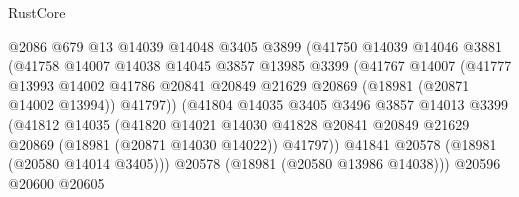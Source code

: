 \begin{lexlean}{RustCore}
\begin{coremodule}
                                @2086
                                @679
                                @13
                                @14039
                                @14048
                                @3405
                                @3899
                                (@41750
                                  @14039
                                  @14046
                                  @3881
                                  (@41758
                                    @14007
                                    @14038
                                    @14045
                                    @3857
                                    @13985
                                    @3399
                                    (@41767
                                      @14007
                                      (@41777
                                        @13993
                                        @14002
                                        @41786
                                        @20841
                                        @20849
                                        @21629
                                        @20869
                                        (@18981 (@20871 @14002 @13994))
                                        @41797))
                                    (@41804
                                      @14035
                                      @3405
                                      @3496
                                      @3857
                                      @14013
                                      @3399
                                      (@41812
                                        @14035
                                        (@41820
                                          @14021
                                          @14030
                                          @41828
                                          @20841
                                          @20849
                                          @21629
                                          @20869
                                          (@18981 (@20871 @14030 @14022))
                                          @41797))
                                      @41841
                                      @20578
                                      (@18981 (@20580 @14014 @3405)))
                                    @20578
                                    (@18981 (@20580 @13986 @14038)))
                                  @20596
                                  @20600
                                  @20605

\end{coremodule}
\end{lexlean}
